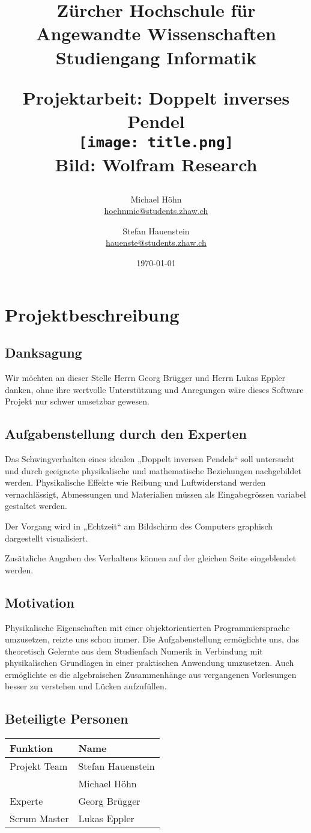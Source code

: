 \documentclass[12pt]{article}
\title{\vspace{-1cm}\linespread{1}\begin{flushleft}\normalsize{Zürcher Hochschule für Angewandte Wissenschaften\\Studiengang Informatik\\}\end{flushleft}\vspace{2cm}\Large{Projektarbeit: Doppelt inverses Pendel}\\\vspace{2cm} \texttt{[image: title.png]} \\ \tiny{Bild: Wolfram Research}}
\author{Michael Höhn\\\href{mailto:hoehnmic@students.zhaw.ch}{hoehnmic@students.zhaw.ch} \and Stefan Hauenstein\\\href{mailto:hauenste@students.zhaw.ch}{hauenste@students.zhaw.ch}}
\date{\today}
\numberwithin{equation}{subsection}
\begin{document}
\maketitle\thispagestyle{empty}
\newpage

\tableofcontents


\newpage
\section{Projektbeschreibung}
\subsection{Danksagung}
Wir möchten an dieser Stelle Herrn Georg Brügger und Herrn Lukas Eppler danken, ohne ihre wertvolle Unterstützung und Anregungen wäre dieses Software Projekt nur schwer umsetzbar gewesen.

\subsection{Aufgabenstellung durch den Experten}
Das Schwingverhalten eines idealen „Doppelt inversen Pendels“ soll untersucht und durch geeignete physikalische und mathematische Beziehungen nachgebildet werden. Physikalische Effekte wie Reibung und Luftwiderstand werden vernachlässigt, Abmessungen und Materialien müssen als Eingabegrössen variabel gestaltet werden.

Der Vorgang wird in „Echtzeit“ am Bildschirm des Computers graphisch dargestellt visualisiert.

Zusätzliche Angaben des Verhaltens können auf der gleichen Seite eingeblendet werden.

\subsection{Motivation}
Physikalische Eigenschaften mit einer objektorientierten Programmiersprache umzusetzen, reizte uns schon immer. Die  Aufgabenstellung ermöglichte uns, das theoretisch Gelernte aus dem Studienfach Numerik in Verbindung mit physikalischen Grundlagen in einer praktischen Anwendung umzusetzen. Auch ermöglichte es die algebraischen Zusammenhänge aus vergangenen Vorlesungen besser zu verstehen und Lücken aufzufüllen.

\subsection{Beteiligte Personen}
\begin{tabularx}{\textwidth}{|X|X|}
	\hline
	\textbf{Funktion} & \textbf{Name} \\
	\hline
	Projekt Team      & Stefan Hauenstein \\
	                  & Michael Höhn \\
	\hline
	Experte           & Georg Brügger\\
	\hline
	Scrum Master      & Lukas Eppler\\
	\hline
\end{tabularx}
\end{document}
